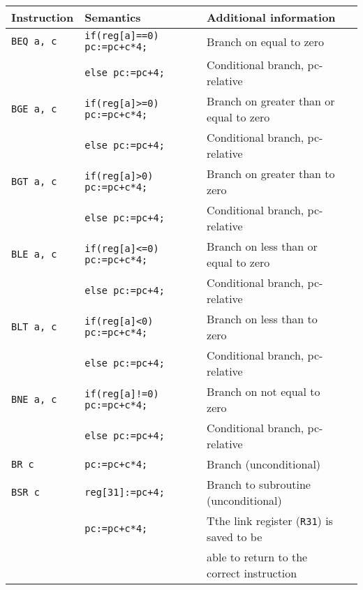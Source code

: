 \par{
    \noindent
    \begin{tabular}{llll}
        \hline
        Instruction 			& Semantics 							& Additional information 								\\
        \hline
        \hline
        \texttt{BEQ a, c}    	&   \texttt{if(reg[a]==0) pc:=pc+c*4;} 	&   Branch on equal to zero                            	\\
                                &   \texttt{else pc:=pc+4;}             &  	Conditional branch, pc-relative						\\
        \texttt{BGE a, c}    	&   \texttt{if(reg[a]>=0) pc:=pc+c*4;} 	&   Branch on greater than or equal to zero             \\
                                &   \texttt{else pc:=pc+4;}             &  	Conditional branch, pc-relative						\\
        \texttt{BGT a, c}    	&   \texttt{if(reg[a]>0) pc:=pc+c*4;} 	&   Branch on greater than to zero                      \\
                                &   \texttt{else pc:=pc+4;}             &  	Conditional branch, pc-relative						\\
        \texttt{BLE a, c}    	&   \texttt{if(reg[a]<=0) pc:=pc+c*4;} 	&   Branch on less than or equal to zero                \\
                                &   \texttt{else pc:=pc+4;}             &  	Conditional branch, pc-relative						\\
		\texttt{BLT a, c}    	&   \texttt{if(reg[a]<0) pc:=pc+c*4;} 	&   Branch on less than to zero                        	\\
                                &   \texttt{else pc:=pc+4;}             &  	Conditional branch, pc-relative						\\
        \texttt{BNE a, c}    	&   \texttt{if(reg[a]!=0) pc:=pc+c*4;} 	&   Branch on not equal to zero                         \\
                                &   \texttt{else pc:=pc+4;}             &  	Conditional branch, pc-relative						\\
        \texttt{BR c}    		&   \texttt{pc:=pc+c*4;} 				&   Branch (unconditional)								\\
        \texttt{BSR c}    		&   \texttt{reg[31]:=pc+4;} 			&   Branch to subroutine (unconditional)                \\
                                &   \texttt{pc:=pc+c*4;}             	&  	Tthe link register (\texttt{R31}) is saved to be	\\
								&										&	able to return to the correct instruction			\\
        \hline
    \end{tabular}   
}

